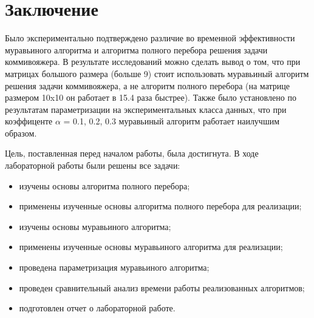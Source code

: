 \chapter*{Заключение}

Было экспериментально подтверждено различие во временной эффективности муравьиного алгоритма и алгоритма полного перебора решения задачи коммивояжера. В результате исследований можно сделать вывод о том, что при матрицах большого размера (больше 9) стоит использовать муравьиный алгоритм решения задачи коммивояжера, а не алгоритм полного перебора (на матрице размером 10x10 он работает в 15.4 раза быстрее). Также было установлено по результатам параметризации на экспериментальных класса данных, что при коэффиценте $\alpha$ = 0.1, 0.2, 0.3 муравьиный алгоритм работает наилучшим образом.
\vspace{5mm}

Цель, поставленная перед началом работы, была достигнута. В ходе лабораторной работы были решены все задачи:

\begin{itemize}[label = ---]
	\item изучены основы алгоритма полного перебора;
	\item применены изученные основы алгоритма полного перебора для реализации;
	\item изучены основы муравьиного алгоритма;
	\item применены изученные основы муравьиного алгоритма для реализации;
	\item проведена параметризация муравьиного алгоритма;
	\item проведен сравнительный анализ времени работы реализованных
	алгоритмов;
	\item подготовлен отчет о лабораторной работе.
\end{itemize}
